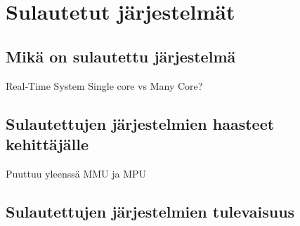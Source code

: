 \chapter{Sulautetut järjestelmät} \label{Kolmas luku}

\section{Mikä on sulautettu järjestelmä}

Real-Time System
Single core vs Many Core?

\section{Sulautettujen järjestelmien haasteet kehittäjälle} 

Puuttuu yleenssä MMU ja MPU

\section{Sulautettujen järjestelmien tulevaisuus}